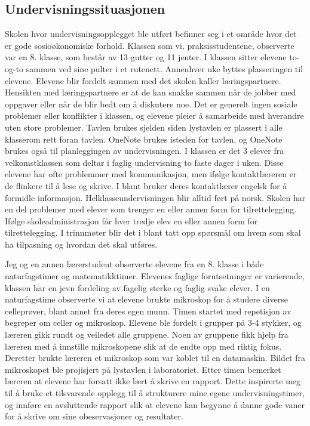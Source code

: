 \documentclass[main.tex]{subfiles}
\begin{document}
\subsection*{Undervisningssituasjonen}
Skolen hvor undervisningsopplegget ble utført befinner seg i et område hvor det er gode sosioøkonomiske forhold. 
Klassen som vi, praksisstudentene, observerte var en 8. klasse, som består av 13 gutter og 11 jenter. 
I klassen sitter elevene to-og-to sammen ved sine pulter i et rutenett. Annenhver uke byttes plasseringen til elevene. 
Elevene blir fordelt sammen med det skolen kaller læringspartnere. Hensikten med læringspartnere er at de kan snakke
sammen når de jobber med oppgaver eller når de blir bedt om å diskutere noe.  Det er generelt ingen sosiale problemer 
eller konflikter i klassen, og elevene pleier å samarbeide med hverandre uten store problemer. Tavlen brukes sjelden 
siden lystavlen er plassert i alle klasserom rett foran tavlen. OneNote brukes isteden for tavlen, og OneNote brukes 
også til planleggingen av undervisningen. I klassen er det 3 elever fra velkomstklassen som deltar i faglig undervisning 
to faste dager i uken. Disse elevene har ofte problemmer med kommunikasjon, men ifølge kontaktlæreren er de flinkere 
til å lese og skrive. I blant bruker deres kontaktlærer engelsk for å formidle informasjon. Helklasseundervisningen 
blir alltid ført på norsk. Skolen har en del problemer med elever som trenger en eller annen form for tilrettelegging. 
Ifølge skoleadministrasjon får hver tredje elev en eller annen form for tilrettelegging. I trinnmøter blir 
det i blant tatt opp spørsmål om hvem som skal ha tilpasning og hvordan det skal utføres.
\newline

Jeg og en annen lærerstudent observerte elevene fra en 8. klasse i både naturfagstimer og matematikktimer. 
Elevenes faglige forutsetninger er varierende, klassen har en jevn fordeling av fagelig sterke og faglig 
svake elever. I en naturfagstime observerte vi at elevene brukte mikroskop for å studere diverse celleprøver, 
blant annet fra deres egen munn. Timen startet med repetisjon av begreper om celler og mikroskop. Elevene 
ble fordelt i grupper på 3-4 stykker, og læreren gikk rundt og veiledet alle gruppene. Noen av gruppene fikk 
hjelp fra læreren med å innstille mikroskopene slik at de endte opp med riktig fokus. Deretter brukte læreren 
et mikroskop som var koblet til en datamaskin. Bildet fra mikroskopet ble projisjert på lystavlen i laboratoriet. 
Etter timen bemerket læreren at elevene har forsatt ikke lært å skrive en rapport. Dette inspirerte meg til å 
bruke et tilsvarende opplegg til å strukturere mine egene undervisningstimer, og innføre en avsluttende rapport 
slik at elevene kan begynne å danne gode vaner for å skrive om sine obeservasjoner og resultater.

\end{document}
